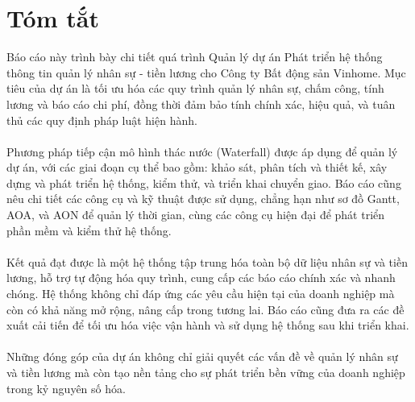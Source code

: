 \chapter*{Tóm tắt}
\label{thanks}
Báo cáo này trình bày chi tiết quá trình Quản lý dự án Phát triển hệ thống thông tin quản lý nhân sự - tiền lương cho Công ty Bất động sản Vinhome. Mục tiêu của dự án là tối ưu hóa các quy trình quản lý nhân sự, chấm công, tính lương và báo cáo chi phí, đồng thời đảm bảo tính chính xác, hiệu quả, và tuân thủ các quy định pháp luật hiện hành.\\\\
Phương pháp tiếp cận mô hình thác nước (Waterfall) được áp dụng để quản lý dự án, với các giai đoạn cụ thể bao gồm: khảo sát, phân tích và thiết kế, xây dựng và phát triển hệ thống, kiểm thử, và triển khai chuyển giao. Báo cáo cũng nêu chi tiết các công cụ và kỹ thuật được sử dụng, chẳng hạn như sơ đồ Gantt, AOA, và AON để quản lý thời gian, cùng các công cụ hiện đại để phát triển phần mềm và kiểm thử hệ thống.\\\\
Kết quả đạt được là một hệ thống tập trung hóa toàn bộ dữ liệu nhân sự và tiền lương, hỗ trợ tự động hóa quy trình, cung cấp các báo cáo chính xác và nhanh chóng. Hệ thống không chỉ đáp ứng các yêu cầu hiện tại của doanh nghiệp mà còn có khả năng mở rộng, nâng cấp trong tương lai. Báo cáo cũng đưa ra các đề xuất cải tiến để tối ưu hóa việc vận hành và sử dụng hệ thống sau khi triển khai.\\\\
Những đóng góp của dự án không chỉ giải quyết các vấn đề về quản lý nhân sự và tiền lương mà còn tạo nền tảng cho sự phát triển bền vững của doanh nghiệp trong kỷ nguyên số hóa.